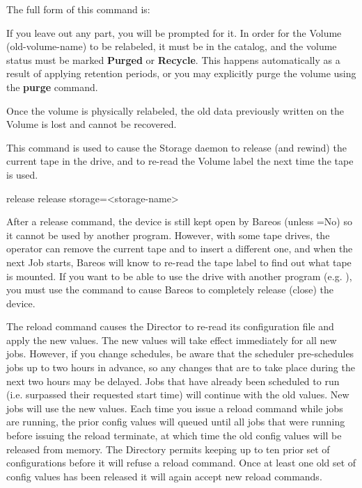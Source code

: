 \begin{description}
   The full form of this command is:

\begin{bconsole}{relabel}
relabel storage=<storage-name> oldvolume=<old-volume-name> volume=<newvolume-name>}
\end{bconsole}

   If you leave out any part, you will be prompted for it.  In order for
   the Volume (old-volume-name) to be relabeled, it must be in the catalog,
   and the volume status must be marked {\bf Purged} or {\bf Recycle}.
   This happens automatically as a result of applying retention periods, or
   you may explicitly purge the volume using the {\bf purge} command.

   Once the volume is physically relabeled, the old data previously written
   on the Volume is lost and cannot be recovered.

\item [release]
   This command is used to cause the Storage daemon to release (and rewind) the
   current tape in the drive, and to re-read the Volume label the next time
   the tape is used.

\begin{bconsole}{release}
release storage=<storage-name>
\end{bconsole}

   After a release command, the device is still kept open by Bareos (unless
   =No) so it
   cannot be used by another program.  However, with some tape drives, the
   operator can remove the current tape and to insert a different one, and
   when the next Job starts, Bareos will know to re-read the tape label to
   find out what tape is mounted.  If you want to be able to use the drive
   with another program (e.g.  ), you must use the 
   command to cause Bareos to completely release (close) the device.

\item [reload]
   The reload command causes the Director to re-read its configuration
   file and apply the new values. The new values will take effect
   immediately for all new jobs.  However, if you change schedules,
   be aware that the scheduler pre-schedules jobs up to two hours in
   advance, so any changes that are to take place during the next two
   hours may be delayed.  Jobs that have already been scheduled to run
   (i.e. surpassed their requested start time) will continue with the
   old values.  New jobs will use the new values. Each time you issue
   a reload command while jobs are running, the prior config values
   will queued until all jobs that were running before issuing
   the reload terminate, at which time the old config values will
   be released from memory. The Directory permits keeping up to
   ten prior set of configurations before it will refuse a reload
   command. Once at least one old set of config values has been
   released it will again accept new reload commands.


\end{description}

